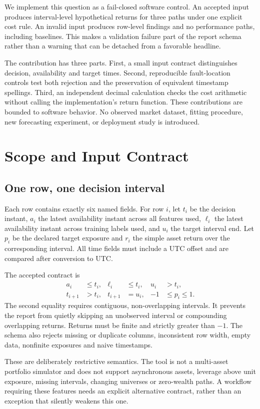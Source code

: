 \documentclass[sigconf,anonymous,nonacm]{acmart}
\begin{document}
We implement this question as a fail-closed software control. An accepted input produces interval-level hypothetical returns for three paths under one explicit cost rule. An invalid input produces row-level findings and no performance paths, including baselines. This makes a validation failure part of the report schema rather than a warning that can be detached from a favorable headline.

The contribution has three parts. First, a small input contract distinguishes decision, availability and target times. Second, reproducible fault-location controls test both rejection and the preservation of equivalent timestamp spellings. Third, an independent decimal calculation checks the cost arithmetic without calling the implementation's return function. These contributions are bounded to software behavior. No observed market dataset, fitting procedure, new forecasting experiment, or deployment study is introduced.

\section{Scope and Input Contract}
\subsection{One row, one decision interval}
Each row contains exactly six named fields. For row $i$, let $t_i$ be the decision instant, $a_i$ the latest availability instant across all features used, $\ell_i$ the latest availability instant across training labels used, and $u_i$ the target interval end. Let $p_i$ be the declared target exposure and $r_i$ the simple asset return over the corresponding interval. All time fields must include a UTC offset and are compared after conversion to UTC.

The accepted contract is
\begin{align}
 a_i &\leq t_i, &\ell_i &\leq t_i, &u_i &> t_i,\\
 t_{i+1} &> t_i, &t_{i+1} &= u_i, &-1&\leq p_i\leq 1.
\end{align}
The second equality requires contiguous, non-overlapping intervals. It prevents the report from quietly skipping an unobserved interval or compounding overlapping returns. Returns must be finite and strictly greater than $-1$. The schema also rejects missing or duplicate columns, inconsistent row width, empty data, nonfinite exposures and naive timestamps.

These are deliberately restrictive semantics. The tool is not a multi-asset portfolio simulator and does not support asynchronous assets, leverage above unit exposure, missing intervals, changing universes or zero-wealth paths. A workflow requiring these features needs an explicit alternative contract, rather than an exception that silently weakens this one.
\end{document}
